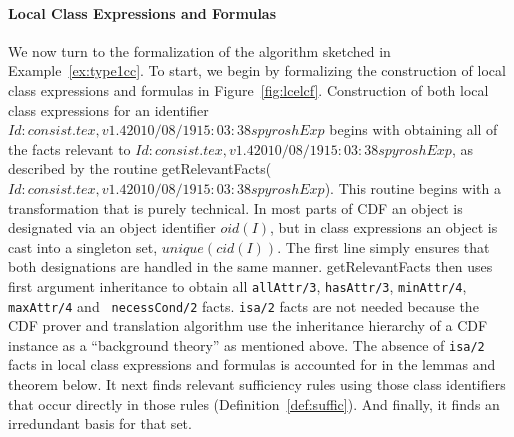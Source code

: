 \paragraph*{Local Class Expressions and Formulas}
We now turn to the formalization of the algorithm sketched in
Example~\ref{ex:type1cc}.  To start, we begin by formalizing the
construction of local class expressions and formulas in
Figure~\ref{fig:lcelcf}.  Construction of both local class expressions
for an identifier $Id: consist.tex,v 1.4 2010/08/19 15:03:38 spyrosh Exp $ begins with obtaining all of the facts relevant
to $Id: consist.tex,v 1.4 2010/08/19 15:03:38 spyrosh Exp $, as described by the routine {\sf getRelevantFacts($Id: consist.tex,v 1.4 2010/08/19 15:03:38 spyrosh Exp $)}.
This routine begins with a transformation that is purely technical.
In most parts of CDF an object is designated via an object identifier
$oid(I)$, but in class expressions an object is cast into a singleton
set, $unique(cid(I))$.  The first line simply ensures that both
designations are handled in the same manner.  {\sf getRelevantFacts}
then uses first argument inheritance to obtain all {\tt allAttr/3},
{\tt hasAttr/3}, {\tt minAttr/4}, {\tt maxAttr/4} and {\tt
necessCond/2} facts.  {\tt isa/2} facts are not needed because the CDF
prover and translation algorithm use the inheritance hierarchy of a
CDF instance as a ``background theory'' as mentioned above.  The
absence of {\tt isa/2} facts in local class expressions and formulas
is accounted for in the lemmas and theorem below. It next finds
relevant sufficiency rules using those class identifiers that occur
directly in those rules (Definition~\ref{def:suffic}).  And finally,
it finds an irredundant basis for that set.


